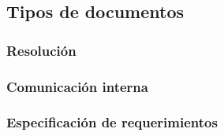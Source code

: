 	

\subsection{Tipos de documentos}

	
	\subsubsection{Resolución}
	\subsubsection{Comunicación interna}
	\subsubsection{Especificación de requerimientos}


